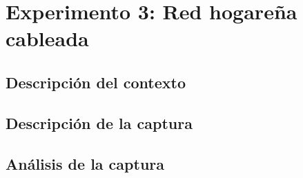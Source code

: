 \section{Experimento 3: Red hogareña cableada}

\subsection{Descripción del contexto}

\subsection{Descripción de la captura}

\subsection{Análisis de la captura}
